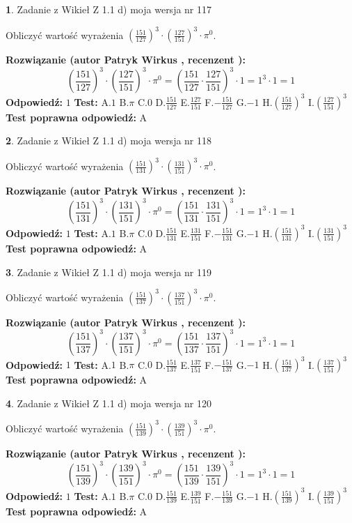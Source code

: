 \documentclass[12pt, a4paper]{article}
\theoremstyle{definition} %
\newtheorem{zad}{}
\newcommand{\zadStart}[1]{\begin{zad}#1\newline}
\newcommand{\zadStop}{\end{zad}}
\newcommand{\rozwStart}[2]{\noindent \textbf{Rozwiązanie (autor #1 , recenzent #2): }\newline}
\newcommand{\rozwStop}{\newline}
\newcommand{\odpStart}{\noindent \textbf{Odpowiedź:}\newline}
\newcommand{\odpStop}{\newline}
\newcommand{\testStart}{\noindent \textbf{Test:}\newline}
\newcommand{\testStop}{\newline}
\newcommand{\kluczStart}{\noindent \textbf{Test poprawna odpowiedź:}\newline}
\newcommand{\kluczStop}{\newline}
\begin{document}
\zadStart{Zadanie z Wikieł Z 1.1 d) moja wersja nr 117}

Obliczyć wartość wyrażenia $(\frac{151}{127})^{3} \cdot (\frac{127}{151})^{3} \cdot \pi^{0}$.
\zadStop
\rozwStart{Patryk Wirkus}{}
$$(\frac{151}{127})^{3} \cdot (\frac{127}{151})^{3} \cdot \pi^{0} = (\frac{151}{127} \cdot \frac{127}{151})^{3} \cdot 1 = 1^{3} \cdot 1 = 1$$
\rozwStop
\odpStart
$1$
\odpStop
\testStart
A.$1$ B.$\pi$ C.$0$ D.$\frac{151}{127}$ E.$\frac{127}{151}$
F.$-\frac{151}{127}$ G.$-1$
H.$(\frac{151}{127})^{3}$
I.$(\frac{127}{151})^{3}$
\testStop
\kluczStart
A
\kluczStop



\zadStart{Zadanie z Wikieł Z 1.1 d) moja wersja nr 118}

Obliczyć wartość wyrażenia $(\frac{151}{131})^{3} \cdot (\frac{131}{151})^{3} \cdot \pi^{0}$.
\zadStop
\rozwStart{Patryk Wirkus}{}
$$(\frac{151}{131})^{3} \cdot (\frac{131}{151})^{3} \cdot \pi^{0} = (\frac{151}{131} \cdot \frac{131}{151})^{3} \cdot 1 = 1^{3} \cdot 1 = 1$$
\rozwStop
\odpStart
$1$
\odpStop
\testStart
A.$1$ B.$\pi$ C.$0$ D.$\frac{151}{131}$ E.$\frac{131}{151}$
F.$-\frac{151}{131}$ G.$-1$
H.$(\frac{151}{131})^{3}$
I.$(\frac{131}{151})^{3}$
\testStop
\kluczStart
A
\kluczStop



\zadStart{Zadanie z Wikieł Z 1.1 d) moja wersja nr 119}

Obliczyć wartość wyrażenia $(\frac{151}{137})^{3} \cdot (\frac{137}{151})^{3} \cdot \pi^{0}$.
\zadStop
\rozwStart{Patryk Wirkus}{}
$$(\frac{151}{137})^{3} \cdot (\frac{137}{151})^{3} \cdot \pi^{0} = (\frac{151}{137} \cdot \frac{137}{151})^{3} \cdot 1 = 1^{3} \cdot 1 = 1$$
\rozwStop
\odpStart
$1$
\odpStop
\testStart
A.$1$ B.$\pi$ C.$0$ D.$\frac{151}{137}$ E.$\frac{137}{151}$
F.$-\frac{151}{137}$ G.$-1$
H.$(\frac{151}{137})^{3}$
I.$(\frac{137}{151})^{3}$
\testStop
\kluczStart
A
\kluczStop



\zadStart{Zadanie z Wikieł Z 1.1 d) moja wersja nr 120}

Obliczyć wartość wyrażenia $(\frac{151}{139})^{3} \cdot (\frac{139}{151})^{3} \cdot \pi^{0}$.
\zadStop
\rozwStart{Patryk Wirkus}{}
$$(\frac{151}{139})^{3} \cdot (\frac{139}{151})^{3} \cdot \pi^{0} = (\frac{151}{139} \cdot \frac{139}{151})^{3} \cdot 1 = 1^{3} \cdot 1 = 1$$
\rozwStop
\odpStart
$1$
\odpStop
\testStart
A.$1$ B.$\pi$ C.$0$ D.$\frac{151}{139}$ E.$\frac{139}{151}$
F.$-\frac{151}{139}$ G.$-1$
H.$(\frac{151}{139})^{3}$
I.$(\frac{139}{151})^{3}$
\testStop
\kluczStart
A
\kluczStop
\end{document}
